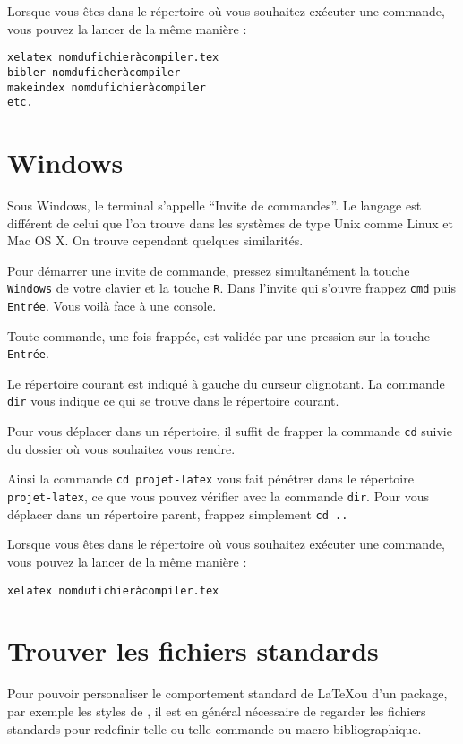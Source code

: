 Lorsque vous êtes dans le répertoire où vous souhaitez exécuter une
commande, vous pouvez la lancer de la même manière :

\begin{verbatim}
xelatex nomdufichieràcompiler.tex
bibler nomduficheràcompiler
makeindex nomdufichieràcompiler
etc.
\end{verbatim}

\section{Windows}
Sous Windows, le terminal s'appelle \enquote{Invite de commandes}. Le langage
est différent de celui que l'on trouve dans les systèmes de type Unix comme
Linux et Mac OS X. On trouve cependant quelques similarités.

Pour démarrer une invite de commande, pressez simultanément la touche \verb|Windows| de votre
clavier et la touche \verb|R|. Dans l'invite qui s'ouvre frappez \verb|cmd| puis
\verb|Entrée|. Vous voilà face à une console.

Toute commande, une fois frappée, est validée par une pression sur la touche \verb|Entrée|.

Le répertoire courant est indiqué à gauche du curseur clignotant.
La commande \verb|dir| vous indique ce qui se trouve dans le répertoire
courant.

Pour vous déplacer dans un répertoire, il suffit de frapper la commande
\verb|cd| suivie du dossier où vous souhaitez vous rendre.

Ainsi la commande \verb|cd projet-latex| vous fait pénétrer dans le
répertoire \verb|projet-latex|, ce que vous pouvez vérifier avec la
commande \verb|dir|. Pour vous déplacer dans un répertoire parent, frappez
simplement \verb|cd ..|

Lorsque vous êtes dans le répertoire où vous souhaitez exécuter une
commande, vous pouvez la lancer de la même manière :

\begin{verbatim}
xelatex nomdufichieràcompiler.tex
\end{verbatim}

\section{Trouver les fichiers standards}\label{trouverfichier}

Pour pouvoir personaliser le comportement standard de \LaTeX ou d'un package, par exemple les styles de , il est en général nécessaire de regarder les fichiers standards pour redefinir telle ou telle commande ou macro bibliographique. 

